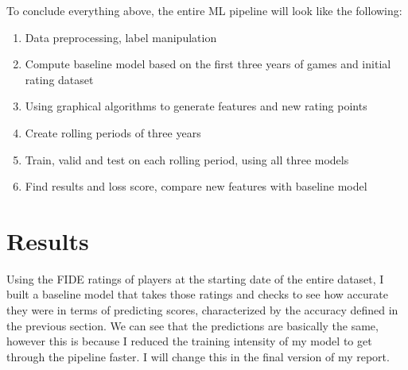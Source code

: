 \documentclass[12pt, letterpaper]{article}
\begin{document}
\begin{multicols}{2}
To conclude everything above, the entire ML pipeline will look like the following:
\begin{enumerate}
	\item Data preprocessing, label manipulation
	\item Compute baseline model based on the first three years of games and initial rating dataset
	\item Using graphical algorithms to generate features and new rating points
	\item Create rolling periods of three years
	\item Train, valid and test on each rolling period, using all three models
	\item Find results and loss score, compare new features with baseline model
\end{enumerate}


\section*{Results}

Using the FIDE ratings of players at the starting date of the entire dataset, I built a baseline model that takes those ratings and checks to see how accurate they were in terms of predicting scores, characterized by the accuracy defined in the previous section. We can see that the predictions are basically the same, however this is because I reduced the training intensity of my model to get through the pipeline faster. I will change this in the final version of my report.


\end{multicols}
\end{document}
